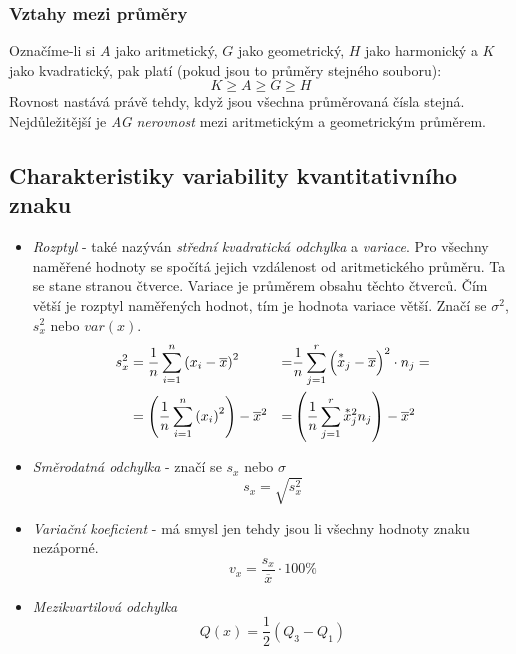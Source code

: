 \documentclass[12pt]{article}
\begin{document}
\subsubsection{Vztahy mezi průměry}
Označíme-li si $A$ jako aritmetický, $G$ jako geometrický, $H$ jako harmonický a $K$ jako kvadratický, pak platí (pokud jsou to průměry stejného souboru):
\begin{equation}
K \geq A \geq G \geq H
\end{equation}
Rovnost nastává právě tehdy, když jsou všechna průměrovaná čísla stejná. Nejdůležitější je \emph{AG nerovnost} mezi aritmetickým a geometrickým průměrem.
\subsection{Charakteristiky variability kvantitativního znaku}
\begin{itemize}
\item \emph{Rozptyl} - také nazýván \emph{střední kvadratická odchylka} a \emph{variace}. Pro všechny naměřené hodnoty se spočítá jejich vzdálenost od aritmetického průměru. Ta se stane stranou čtverce. Variace je průměrem obsahu těchto čtverců. Čím větší je rozptyl naměřených hodnot, tím je hodnota variace větší. Značí se $\sigma^2$, $s_x^2$ nebo $var(x)$.
\begin{align}
\label{eq:rozptyl}
s_x^2 &= \frac{1}{n} \sum^n_{i=1}\left(x_i - \overline{x} \right)^2 &=& \frac{1}{n} \sum^r_{j=1}\left(\overset{*}{x}_j - \overline{x} \right)^2 \cdot n_j=\\
&= \left( \frac{1}{n} \sum^n_{i=1}\left(x_i \right)^2 \right) - \overline{x}^2 &=&  \left( \frac{1}{n} \sum^r_{j=1} \accentset{\scriptstyle *}{x}_j^2 n_j \right) - \overline{x}^2
\end{align}
\item \emph{Směrodatná odchylka} - značí se $s_x$ nebo $\sigma$
\begin{equation}
s_x = \sqrt{s_x^2}
\end{equation}
\item \emph{Variační koeficient} - má smysl jen tehdy jsou li všechny hodnoty znaku nezáporné.
\begin{equation}
v_x = \frac{s_x}{\overline{x}} \cdot 100\%
\end{equation}
\item \emph{Mezikvartilová odchylka}
\begin{equation}
Q(x) = \frac{1}{2}\left(Q_3 - Q_1 \right)
\end{equation}
\end{itemize}
\end{document}
